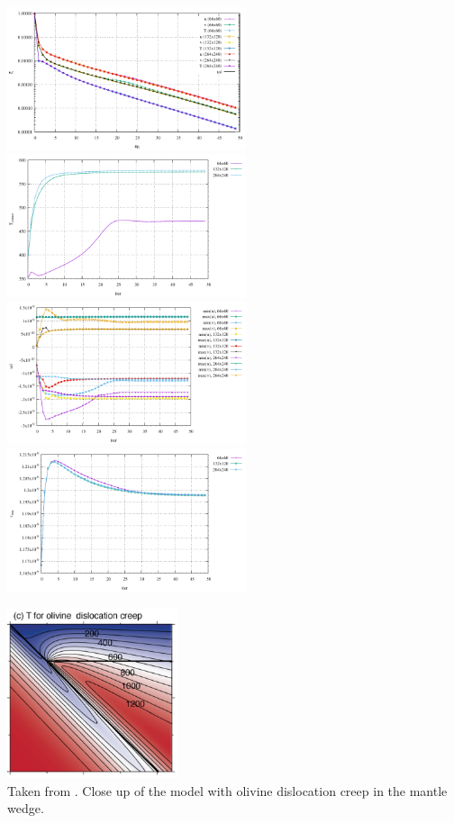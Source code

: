 \begin{center}
\includegraphics[width=7cm]{python_codes/fieldstone_68/results/case2b/conv.pdf}
\includegraphics[width=7cm]{python_codes/fieldstone_68/results/case2b/stats_Tcorner.pdf}\\
\includegraphics[width=7cm]{python_codes/fieldstone_68/results/case2b/stats_uv.pdf}
\includegraphics[width=7cm]{python_codes/fieldstone_68/results/case2b/vrms.pdf}
\end{center}

\begin{center}
\includegraphics[width=5cm]{python_codes/fieldstone_68/images/fig4c}\\
{\captionfont Taken from \cite{vack08}. 
Close up of the model with olivine dislocation creep in the mantle wedge.}
\end{center}




